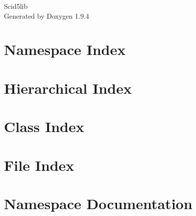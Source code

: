 \documentclass[twoside]{book}
\newcommand{\+}{\discretionary{\mbox{\scriptsize$\hookleftarrow$}}{}{}}
\newcommand{\clearemptydoublepage}{%
    \newpage{\pagestyle{empty}\cleardoublepage}%
  }
\begin{document}
  \raggedbottom
    \hypersetup{pageanchor=false,
                bookmarksnumbered=true,
                pdfencoding=unicode
               }
  \begin{titlepage}
  \vspace*{7cm}
  \begin{center}%
  {\Large Scid5lib}\\
  \vspace*{1cm}
  {\large Generated by Doxygen 1.9.4}\\
  \end{center}
  \end{titlepage}
  \clearemptydoublepage
  \tableofcontents
  \clearemptydoublepage
  \hypersetup{pageanchor=true}
\chapter{Namespace Index}

\chapter{Hierarchical Index}

\chapter{Class Index}

\chapter{File Index}

\chapter{Namespace Documentation}





\end{document}

